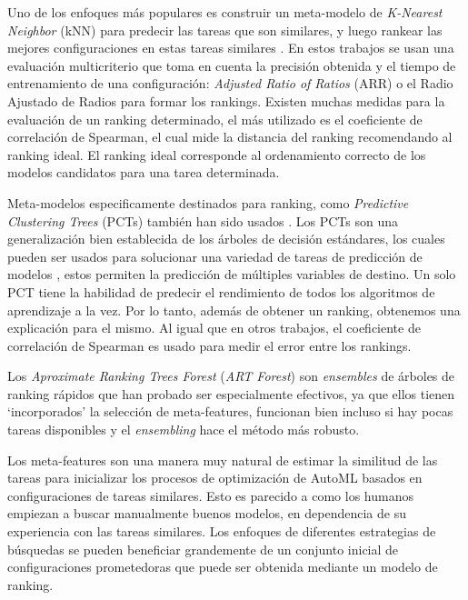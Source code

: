 Uno de los enfoques más populares es construir un meta-modelo de \textit{K-Nearest Neighbor} (kNN) para predecir las tareas que son similares, y luego rankear las mejores configuraciones en estas tareas similares \cite{santos2004selection, bradzil2003ranking}. En estos trabajos se usan una evaluación multicriterio que toma en cuenta la precisión obtenida y el tiempo de entrenamiento de una configuración: \textit{Adjusted Ratio of Ratios} (ARR) o el Radio Ajustado de Radios para formar los rankings. Existen muchas medidas para la evaluación de un ranking determinado, el más utilizado es el coeficiente de correlación de Spearman, el cual mide la distancia del ranking recomendando al ranking ideal. El ranking ideal corresponde al ordenamiento correcto de los modelos candidatos para una tarea determinada.
 
Meta-modelos especificamente destinados para ranking, como \textit{Predictive Clustering Trees} (PCTs) también han sido usados \cite{todorovski2002ranking}. Los PCTs son una generalización bien establecida de los árboles de decisión estándares, los cuales pueden ser usados para solucionar una variedad de tareas de predicción de modelos \cite{tomaz2020oblique}, estos permiten la predicción de múltiples variables de destino. Un solo PCT tiene la habilidad de predecir el rendimiento de todos los algoritmos de aprendizaje a la vez. Por lo tanto, además de obtener un ranking, obtenemos una explicación para el mismo. Al igual que en otros trabajos, el coeficiente de correlación de Spearman es usado para medir el error entre los rankings.
 
Los \textit{Aproximate Ranking Trees Forest} (\textit{ART Forest}) \cite{sun2013pairwise} son \textit{ensembles} de árboles de ranking rápidos que han probado ser especialmente efectivos, ya que ellos tienen `incorporados' la selección de meta-features, funcionan bien incluso si hay pocas tareas disponibles y el \textit{ensembling} hace el método más robusto.

Los meta-features son una manera muy natural de estimar la similitud de las tareas para inicializar los procesos de optimización de AutoML basados en configuraciones de tareas similares. Esto es parecido a como los humanos empiezan a buscar manualmente buenos modelos, en dependencia de su experiencia con las tareas similares. Los enfoques de diferentes estrategias de búsquedas se pueden beneficiar grandemente de un conjunto inicial de configuraciones prometedoras que puede ser obtenida mediante un modelo de ranking.

